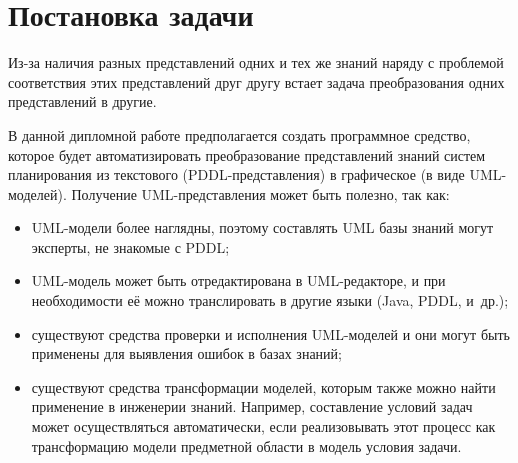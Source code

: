 \chapter{Постановка задачи}

    Из-за наличия разных представлений одних и тех же знаний наряду с проблемой соответствия этих представлений друг другу встает задача преобразования одних представлений в другие.
 
    В данной дипломной работе предполагается создать программное средство, которое будет автоматизировать преобразование представлений знаний систем планирования из текстового (PDDL-представления) в графическое (в виде UML-моделей).
 Получение UML-представления может быть полезно, так как:
    \begin{itemize}
        \item UML-модели более наглядны, поэтому составлять UML базы знаний могут эксперты, не знакомые с PDDL;
        \item UML-модель может быть отредактирована в UML-редакторе, и при необходимости её можно транслировать в другие языки (Java, PDDL, и~др.);
        \item существуют средства проверки и исполнения UML-моделей и они могут быть применены для выявления ошибок в базах знаний\cite{use}; 
        \item существуют средства трансформации моделей, которым также можно найти применение в инженерии знаний. Например, составление условий задач может осуществляться автоматически, если реализовывать этот процесс как трансформацию модели предметной области в модель условия задачи.
    \end{itemize}

